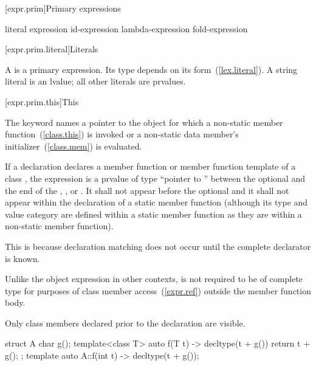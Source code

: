 [expr.prim]{Primary expressions}%

\begin{bnf}
\br
    literal\br
    \br
    \terminal{(} expression \terminal{)}\br
    id-expression\br
    lambda-expression\br
    fold-expression
\end{bnf}

[expr.prim.literal]{Literals}

\pnum
A
%
%
is a primary expression.
Its type depends on its form~(\ref{lex.literal}).
A string literal is an lvalue; all other literals are prvalues.

[expr.prim.this]{This}

\pnum
{}%
The keyword  names a pointer to the object for which a non-static member
function~(\ref{class.this}) is invoked or a non-static data member's
initializer~(\ref{class.mem}) is evaluated.

\pnum
If a declaration declares a member function or member function template of a
class , the expression  is a prvalue of type ``pointer to
 '' between the optional
 and the end of the ,
, or . It shall not appear
before the optional  and it shall not appear within
the declaration of a static member function (although its type and value category
are defined within a static member function as they are within a non-static
member function). \begin{note} This is because declaration matching does not
occur until the complete declarator is known. \end{note} Unlike the object
expression in other contexts,  is not required to be of complete
type for purposes of class member access~(\ref{expr.ref}) outside the member
function body. \begin{note} Only class members declared prior to the declaration
are visible. \end{note}
\begin{example}
\begin{codeblock}
struct A {
  char g();
  template<class T> auto f(T t) -> decltype(t + g())
    { return t + g(); }
};
template auto A::f(int t) -> decltype(t + g());
\end{codeblock}
\end{example}

